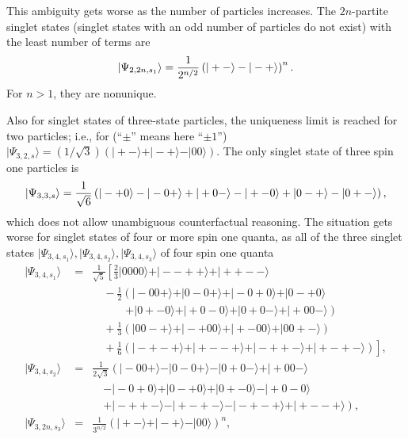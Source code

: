 \documentclass[pra,amsfonts,showpacs,preprint,showkeys]{revtex4}
\begin{document}
This ambiguity gets worse as the number of particles increases.
The $2n$-partite singlet states (singlet states with an odd number of particles do not exist)
with the least number of terms are
\begin{equation}
\vert \Psi_{2,2n,s_1} \rangle
= {1\over 2^{n/2}}\left(
\vert +- \rangle -
\vert -+ \rangle
\right)^n .
\end{equation}
For $n>1$, they are nonunique.

Also for singlet states of three-state particles, the uniqueness limit is reached for two particles;
i.e., for (``$\pm$'' means here ``$\pm 1$'') $
\vert \Psi_{3,2,s} \rangle
= ({1/ \sqrt{3}})(
\vert + -\rangle
+
\vert - +\rangle
-
\vert 0 0\rangle
)$.
The only singlet state of three spin one particles is
\begin{equation}
\vert \Psi_{3,3,s} \rangle
= {1\over \sqrt{6}}\left(
\vert - + 0\rangle
-
\vert - 0 +\rangle
+
\vert + 0 - \rangle
-
\vert + - 0\rangle
+
\vert 0 - + \rangle
-
\vert 0 + - \rangle
\right),
\end{equation}
which does not allow unambiguous counterfactual reasoning.
The situation gets worse for singlet states of four or more spin one quanta,
as all of the three singlet states $\vert \Psi_{3,4,s_1}\rangle , \vert \Psi_{3,4,s_2}\rangle , \vert \Psi_{3,4,s_3}\rangle$
of four spin one quanta
\begin{eqnarray}
\vert \Psi_{3,4,s_1}\rangle  &=&
\frac{1}{\sqrt{5}}
\left[
\frac{2}{3}
\vert0000\rangle
+
\vert --++\rangle  +\vert ++--\rangle   \right.
\nonumber \\
&&\quad
- \frac{1}{2}
\left(
\vert-00+\rangle
+\vert0-0+\rangle
+\vert-0+0\rangle
+\vert0-+0\rangle \nonumber  \right. \\
&& \left. \quad
\qquad
+\vert0+-0\rangle
+\vert +0-0\rangle
+\vert0+0-\rangle
+\vert+00-\rangle
\right)\nonumber \\
&&\quad
+\frac{1}{3}
\left(
\vert00-+\rangle
+\vert -+00\rangle
+\vert+-00\rangle
+\vert00+-\rangle
\right)\nonumber \\
&&\quad
+
\left. \frac{1}{6}
\left(
\vert-+-+\rangle
+\vert+--+\rangle
+\vert-++-\rangle
+\vert+-+-\rangle
\right)
\right] ,
 \\
\vert \Psi_{3,4,s_2}\rangle  &=&\frac{1}{2{\sqrt{3}}}
\left(
\vert -00+\rangle
- \vert 0-0+\rangle
- \vert 0+0-\rangle
+\vert +00-\rangle \right. \nonumber \\
&&\quad
- \vert -0+0\rangle
+\vert 0-+0\rangle
+\vert 0+-0\rangle
- \vert +0-0\rangle \nonumber    \\
&&\quad \left.
+\vert -++-\rangle
- \vert +-+-\rangle
- \vert -+-+\rangle
+\vert +--+\rangle
\right) ,
  \\
  \vert \Psi_{3,2n,s_3}\rangle &=& \frac{1}{3^{n/2}}
\left(
\vert + -\rangle
+
\vert - +\rangle
-
\vert 0 0\rangle
\right)^n ,
\end{eqnarray}
\end{document}
